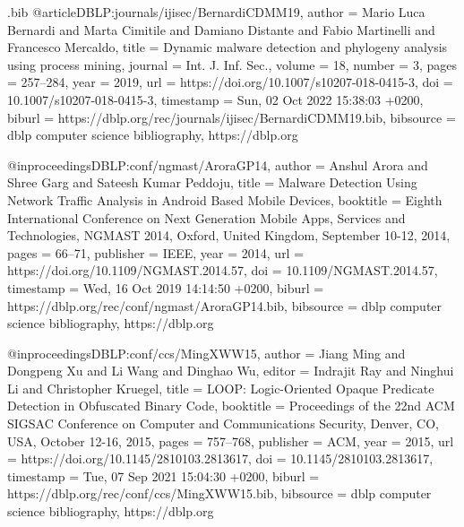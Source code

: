 \begin{filecontents}{\jobname.bib}
@article{DBLP:journals/ijisec/BernardiCDMM19,
  author       = {Mario Luca Bernardi and
                  Marta Cimitile and
                  Damiano Distante and
                  Fabio Martinelli and
                  Francesco Mercaldo},
  title        = {Dynamic malware detection and phylogeny analysis using process mining},
  journal      = {Int. J. Inf. Sec.},
  volume       = {18},
  number       = {3},
  pages        = {257--284},
  year         = {2019},
  url          = {https://doi.org/10.1007/s10207-018-0415-3},
  doi          = {10.1007/s10207-018-0415-3},
  timestamp    = {Sun, 02 Oct 2022 15:38:03 +0200},
  biburl       = {https://dblp.org/rec/journals/ijisec/BernardiCDMM19.bib},
  bibsource    = {dblp computer science bibliography, https://dblp.org}
}

@inproceedings{DBLP:conf/ngmast/AroraGP14,
  author       = {Anshul Arora and
                  Shree Garg and
                  Sateesh Kumar Peddoju},
  title        = {Malware Detection Using Network Traffic Analysis in Android Based
                  Mobile Devices},
  booktitle    = {Eighth International Conference on Next Generation Mobile Apps, Services
                  and Technologies, {NGMAST} 2014, Oxford, United Kingdom, September
                  10-12, 2014},
  pages        = {66--71},
  publisher    = {{IEEE}},
  year         = {2014},
  url          = {https://doi.org/10.1109/NGMAST.2014.57},
  doi          = {10.1109/NGMAST.2014.57},
  timestamp    = {Wed, 16 Oct 2019 14:14:50 +0200},
  biburl       = {https://dblp.org/rec/conf/ngmast/AroraGP14.bib},
  bibsource    = {dblp computer science bibliography, https://dblp.org}
}

@inproceedings{DBLP:conf/ccs/MingXWW15,
  author       = {Jiang Ming and
                  Dongpeng Xu and
                  Li Wang and
                  Dinghao Wu},
  editor       = {Indrajit Ray and
                  Ninghui Li and
                  Christopher Kruegel},
  title        = {{LOOP:} Logic-Oriented Opaque Predicate Detection in Obfuscated Binary
                  Code},
  booktitle    = {Proceedings of the 22nd {ACM} {SIGSAC} Conference on Computer and
                  Communications Security, Denver, CO, USA, October 12-16, 2015},
  pages        = {757--768},
  publisher    = {{ACM}},
  year         = {2015},
  url          = {https://doi.org/10.1145/2810103.2813617},
  doi          = {10.1145/2810103.2813617},
  timestamp    = {Tue, 07 Sep 2021 15:04:30 +0200},
  biburl       = {https://dblp.org/rec/conf/ccs/MingXWW15.bib},
  bibsource    = {dblp computer science bibliography, https://dblp.org}
}


\end{filecontents}
